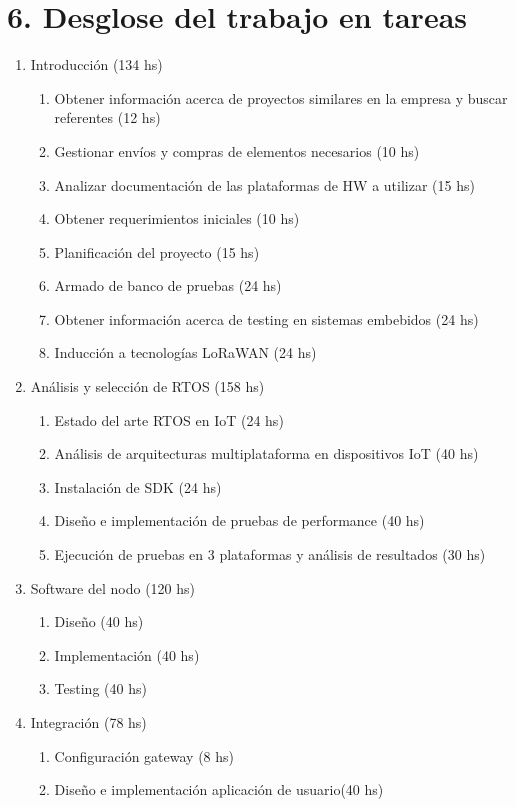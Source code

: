 \documentclass[11pt]{charter}
\begin{document}
\section{6. Desglose del trabajo en tareas}
\label{sec:wbs}

\begin{enumerate}
\item Introducción (134 hs)
	\begin{enumerate}
	\item Obtener información acerca de proyectos similares en la empresa y buscar referentes (12 hs)
	\item Gestionar envíos y compras de elementos necesarios (10 hs)
	\item Analizar documentación de las plataformas de HW a utilizar (15 hs)
	\item Obtener requerimientos iniciales (10 hs)
	\item Planificación del proyecto (15 hs)
	\item Armado de banco de pruebas (24 hs)
	\item Obtener información acerca de testing en sistemas embebidos (24 hs)
	\item Inducción a tecnologías LoRaWAN (24 hs)
	\end{enumerate}
\item Análisis y selección de RTOS (158 hs)
	\begin{enumerate}
	\item Estado del arte RTOS en IoT (24 hs)
	\item Análisis de arquitecturas multiplataforma en dispositivos IoT (40 hs)
	\item Instalación de SDK (24 hs)
	\item Diseño e implementación de pruebas de performance (40 hs)
	\item Ejecución de pruebas en 3 plataformas y análisis de resultados (30 hs)
	\end{enumerate}	
\item Software del nodo (120 hs)
	\begin{enumerate}
	\item Diseño (40 hs)
	\item Implementación (40 hs)
	\item Testing (40 hs)
	\end{enumerate}
\item Integración (78 hs)
	\begin{enumerate}
	\item Configuración gateway (8 hs)
	\item Diseño e implementación aplicación de usuario(40 hs)

\end{enumerate}
\end{enumerate}
\end{document}
